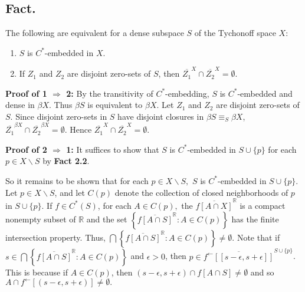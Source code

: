 \documentclass{article}
\begin{document}
		  \vskip 40pt












		  \subsection{Fact.} The following are equivalent for a dense subspace $S$ of the Tychonoff space $X$: 
		  \begin{enumerate}
		  \item $S$ is $C^*$-embedded in $X$. 
		  \item If $Z_1$ and $Z_2$ are disjoint zero-sets of $S$, then $\overline{Z_1}^X\cap \overline{Z_2}^X=\emptyset$.
		  \end{enumerate}


		  \vskip 10pt

		  \textbf{Proof of 1 $\Rightarrow$ 2: }  By the transitivity of $C^*$-embedding, $S$ is $C^*$-embedded and dense in $\beta X$. Thus $\beta S$ is equivalent to $\beta X$. Let $Z_1$ and $Z_2$ are disjoint zero-sets of $S$. Since disjoint zero-sets in $S$ have disjoint closures in $\beta S \equiv_S \beta X$, $\overline{Z_1}^{\beta X}\cap \overline{Z_2}^{\beta X}=\emptyset$. Hence $\overline{Z_1}^X\cap \overline{Z_2}^X=\emptyset$.


		  \vskip 20pt



		  \textbf{Proof of 2 $\Rightarrow$ 1: } It suffices to show that $S$ is $C^*$-embedded in $S\cup \{p\}$ for each $p\in X\backslash S$ by \textbf{Fact 2.2}.  


		  \vskip 15pt

		  So it remains to be shown that for each $p\in X\backslash S,$ $S$ is $C^*$-embedded in $S\cup \{p\}$. Let $p\in X\backslash S$, and let $C(p)$ denote the collection of closed neighborhoods of $p$ in $S\cup \{p\}.$ If $f\in C^*(S)$, for each $A\in C(p),$ the $\overline{f\left[A\cap X\right]}^{\mathbb{R}}$ is a compact nonempty subset of $\mathbb{R}$ and the set $\left\{\overline{f\left[A\cap S\right]}^{\mathbb{R}}: A\in C(p)\right\}$ has the finite intersection property. Thus,  $\bigcap\left\{\overline{f\left[A\cap S\right]}^{\mathbb{R}}: A\in C(p)\right\}\neq \emptyset$. Note that if $s\in \bigcap\left\{ \overline{f[A\cap S]}^{\mathbb{R}}: A\in C(p)\right\}$ and $\epsilon>0$, then $p\in \overline{f^\leftarrow \left[ [s-\epsilon, s+\epsilon]\right]}^{S\cup \{p\}}$. This is because if $A\in C(p)$, then $(s-\epsilon, s+\epsilon)\cap f[A\cap S]\neq \emptyset$ and so $A\cap f^\leftarrow \left[(s-\epsilon, s+\epsilon)\right]\neq \emptyset.$ 
\end{document}
